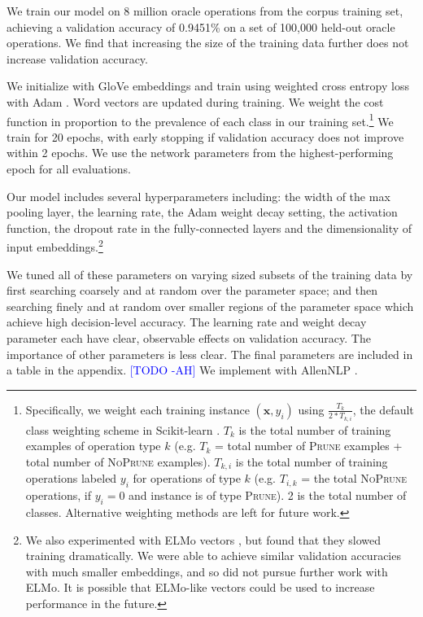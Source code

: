 \documentclass[11pt,a4paper]{article}
\newcommand{\ahcomment}[1]{\textcolor{blue}{[#1 -AH]}}
\begin{document}
We train our model on 8 million oracle operations from the corpus training set, achieving a validation accuracy of 0.9451\% on a set of 100,000 held-out oracle operations. We find that increasing the size of the training data further does not increase validation accuracy. 

We initialize with GloVe embeddings \cite{pennington2014glove} and train using weighted cross entropy loss with Adam \cite{Kingma2014AdamAM}.  Word vectors are updated during training. We weight the cost function in proportion to the prevalence of each class in our training set.\footnote{Specifically, we weight each training instance $(\bm{x}, y_i)$ using $\frac{T_k}{2 * T_{k,i}}$, the default class weighting scheme in Scikit-learn \cite{Pedregosa:2011:SML:1953048.2078195}. $T_k$ is the total number of training examples of operation type $k$ (e.g. $T_k$ = total number of \textsc{Prune} examples + total number of \textsc{NoPrune} examples). $T_{k,i}$ is the total number of training operations labeled $y_i$ for operations of type $k$ (e.g. $T_{i,k}$ = the total \textsc{NoPrune} operations, if $y_i=0$ and instance is of type \textsc{Prune}). 2 is the total number of classes. Alternative weighting methods are left for future work.} We train for 20 epochs, with early stopping if validation accuracy does not improve within 2 epochs. We use the network parameters from the highest-performing epoch for all evaluations.

Our model includes several hyperparameters including: the width of the max pooling layer, the learning rate, the Adam weight decay setting, the activation function, the dropout rate in the fully-connected layers and the dimensionality of input embeddings.\footnote{We also experimented with ELMo vectors \cite{Peters:2018}, but found that they slowed training dramatically. We were able to achieve similar validation accuracies with much smaller embeddings, and so did not pursue further work with ELMo. It is possible that ELMo-like vectors could be used to increase performance in the future.} 

We tuned all of these parameters on varying sized subsets of the training data by first searching coarsely and at random \cite{Bergstra2012RandomSF} over the parameter space; and then searching finely and at random over smaller regions of the parameter space which achieve high decision-level accuracy. The learning rate and weight decay parameter each have clear, observable effects on validation accuracy. 
The importance of other parameters is less clear. The final parameters are included in a table in the appendix. \ahcomment{TODO} We implement with AllenNLP \cite{Gardner2017AllenNLP}.
\end{document}
